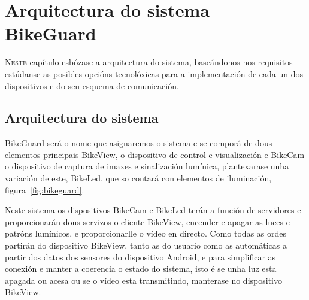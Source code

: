 \chapter{Arquitectura do sistema BikeGuard}
\label{chap:fundamentos_tecnoloxicos}

\lettrine{N}{este} capítulo esbózase a arquitectura do sistema, baseándonos nos requisitos estúdanse as posibles opcións tecnolóxicas para a implementación de cada un dos dispositivos e do seu esquema de comunicación.
\section{Arquitectura do sistema}

BikeGuard será o nome que asignaremos o sistema e se comporá de dous elementos principais BikeView, o dispositivo de control e visualización e BikeCam o dispositivo de captura de imaxes e sinalización lumínica, plantexarase unha variación de este, BikeLed, que so contará con elementos de iluminación, figura~\ref{fig:bikeguard}.

Neste sistema os dispositivos BikeCam e BikeLed terán a función de servidores e proporcionarán dous servizos o cliente BikeView, encender e apagar as luces e patróns lumínicos, e proporcionarlle o vídeo en directo. Como todas as ordes partirán do dispositivo BikeView, tanto as do usuario como as automáticas a partir dos datos dos sensores do dispositivo Android, e para simplificar as conexión e manter a coerencia o estado do sistema, isto é se unha luz esta apagada ou acesa ou se o vídeo esta transmitindo, manterase no dispositivo BikeView.

